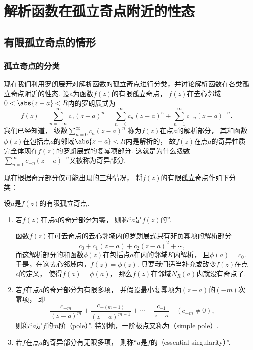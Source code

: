 \section{解析函数在孤立奇点附近的性态}
\subsection{有限孤立奇点的情形}
\subsubsection{孤立奇点的分类}
现在我们利用罗朗展开对解析函数的孤立奇点进行分类，并讨论解析函数在各类孤立奇点附近的性态.
设\(a\)为函数\(f(z)\)的有限孤立奇点，
\(f(z)\)在去心邻域\(0<\abs{z-a}<R\)内的罗朗展式为\begin{equation*}
	f(z) = \sum_{n=-\infty}^\infty c_n (z-a)^n
	= \sum_{n=0}^\infty c_n (z-a)^n
	+ \sum_{n=1}^\infty c_{-n} (z-a)^{-n}.
\end{equation*}
我们已经知道，
级数\(\sum_{n=0}^\infty c_n (z-a)^n\)
称为\(f(z)\)在点\(a\)的解析部分，
其和函数\(\phi(z)\)在包括点\(a\)的邻域\(\abs{z-a}<R\)内是解析的，
故\(f(z)\)在点\(a\)的奇异性质完全体现在\(f(z)\)的罗朗展式的复幂项部分.
这就是为什么级数\(\sum_{n=1}^\infty c_{-n} (z-a)^{-n}\)又被称为奇异部分.

现在根据奇异部分仅可能出现的三种情况，
将\(f(z)\)的有限孤立奇点作如下分类：
\begin{definition}
设\(a\)是\(f(z)\)的有限孤立奇点.
\begin{enumerate}
	\item 若\(f(z)\)在点\(a\)的奇异部分为零，
	则称“\(a\)是\(f(z)\)的”.

	{\footnotesize
	函数\(f(z)\)在可去奇点的去心邻域内的罗朗展式只有非负幂项的解析部分\begin{equation*}
		c_0 + c_1 (z-a) + c_2 (z-a)^2 + \dotsb,
	\end{equation*}
	而这解析部分的和函数\(\phi(z)\)在包括点\(a\)在内的邻域\(K\)内解析，
	且\(\phi(a) = c_0\).
	于是，在这去心邻域内，\(f(z) = \phi(z)\).
	只要我们适当补充或改变\(f(z)\)在点\(a\)的定义，
	使得\(f(a) = \phi(a)\)，
	那么\(f(z)\)在邻域\(N_R(a)\)内就没有奇点了.
	}

	\item 若\(f\)在点\(a\)的奇异部分为有限多项，
	并假设最小复幂项为\((z-a)\)的\((-m)\)次幂项，
	即\begin{equation*}
		\frac{c_{-m}}{(z-a)^m} + \frac{c_{-(m-1)}}{(z-a)^{m-1}}
		+ \dotsb + \frac{c_{-1}}{z-a}
		\quad(c_{-m}\neq0),
	\end{equation*}
	则称“\(a\)是\(f\)的\(m\)阶（pole）”.
	特别地，一阶极点又称为（simple pole）.

	\item 若\(f\)在点\(a\)的奇异部分有无限多项，
	则称“\(a\)是\(f\)的（essential singularity）”.
\end{enumerate}
\end{definition}

